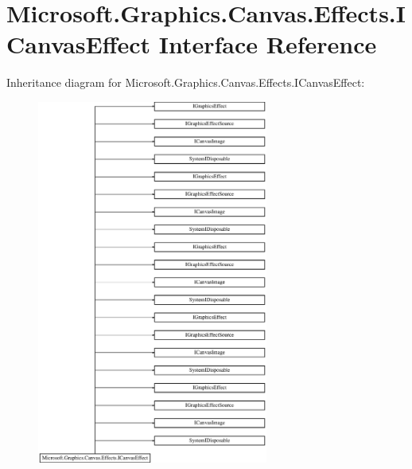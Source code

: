 \hypertarget{interface_microsoft_1_1_graphics_1_1_canvas_1_1_effects_1_1_i_canvas_effect}{}\section{Microsoft.\+Graphics.\+Canvas.\+Effects.\+I\+Canvas\+Effect Interface Reference}
\label{interface_microsoft_1_1_graphics_1_1_canvas_1_1_effects_1_1_i_canvas_effect}
Inheritance diagram for Microsoft.\+Graphics.\+Canvas.\+Effects.\+I\+Canvas\+Effect\+:\begin{figure}[H]
\begin{center}
\leavevmode
\includegraphics[height=12.000000cm]{interface_microsoft_1_1_graphics_1_1_canvas_1_1_effects_1_1_i_canvas_effect}
\end{center}
\end{figure}
